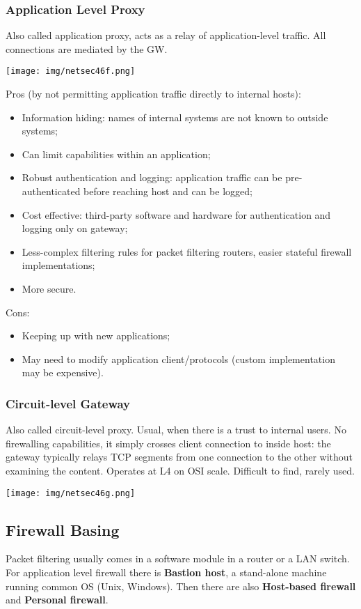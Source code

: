 \documentclass[a4paper, 10pt, titlepage]{article}
\begin{document}
\subsubsection*{Application Level Proxy}
Also called application proxy, acts as a relay of application-level traffic. All connections are mediated by the GW.
\begin{center}
	\texttt{[image: img/netsec46f.png]}
\end{center}
Pros (by not permitting application traffic directly to internal hosts):
\begin{itemize}
	\item Information hiding: names of internal systems are not known to outside systems;
	\item Can limit capabilities within an application;
	\item Robust authentication and logging: application traffic can be pre-authenticated before reaching host and can be logged;
	\item Cost effective: third-party software and hardware for authentication and logging only on gateway;
	\item Less-complex filtering rules for packet filtering routers, easier stateful firewall implementations;
	\item More secure.
\end{itemize}
Cons:
\begin{itemize}
	\item Keeping up with new applications;
	\item May need to modify application client/protocols (custom implementation may be expensive).
\end{itemize}

\subsubsection*{Circuit-level Gateway}
Also called circuit-level proxy. Usual, when there is a trust to internal users. No firewalling capabilities, it simply crosses client connection to inside host: the gateway typically relays TCP segments from one connection to the other without examining the content. Operates at L4 on OSI scale. Difficult to find, rarely used.
\begin{center}
	\texttt{[image: img/netsec46g.png]}
\end{center}

\subsection*{Firewall Basing}
Packet filtering usually comes in a software module in a router or a LAN switch. For application level firewall there is \textbf{Bastion host}, a stand-alone machine running common OS (Unix, Windows). Then there are also \textbf{Host-based firewall} and \textbf{Personal firewall}. 
\end{document}

